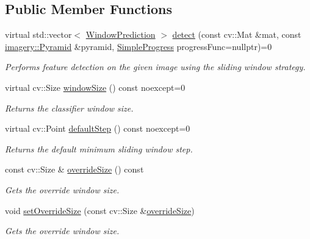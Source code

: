 \subsection*{Public Member Functions}
\begin{DoxyCompactItemize}
\item 
virtual std\+::vector$<$ \hyperlink{structdg_1_1deepcore_1_1classification_1_1_window_prediction}{Window\+Prediction} $>$ \hyperlink{group___classification_module_ga359de047765fb32d9a6f537bf8a4c1f3}{detect} (const cv\+::\+Mat \&mat, const \hyperlink{classdg_1_1deepcore_1_1imagery_1_1_pyramid}{imagery\+::\+Pyramid} \&pyramid, \hyperlink{group___utility_module_ga6763018df79e4bdbcd8cd14cea5342b2}{Simple\+Progress} progress\+Func=nullptr)=0
\begin{DoxyCompactList}\small\item\em Performs feature detection on the given image using the sliding window strategy. \end{DoxyCompactList}\item 
virtual cv\+::\+Size \hyperlink{group___classification_module_ga35c268eb743bfbfb5d77d30ddbcc48e5}{window\+Size} () const noexcept=0
\begin{DoxyCompactList}\small\item\em Returns the classifier window size. \end{DoxyCompactList}\item 
virtual cv\+::\+Point \hyperlink{group___classification_module_ga8e430c585fe3d3bcba00c21f418752d2}{default\+Step} () const noexcept=0
\begin{DoxyCompactList}\small\item\em Returns the default minimum sliding window step. \end{DoxyCompactList}\item 
const cv\+::\+Size \& \hyperlink{classdg_1_1deepcore_1_1classification_1_1_sliding_window_detector_a5c17402f377ea926f2afaf6f1965fa60}{override\+Size} () const 
\begin{DoxyCompactList}\small\item\em Gets the override window size. \end{DoxyCompactList}\item 
void \hyperlink{classdg_1_1deepcore_1_1classification_1_1_sliding_window_detector_a2cc53edf58b59bea7b5c0da7e8de0391}{set\+Override\+Size} (const cv\+::\+Size \&\hyperlink{classdg_1_1deepcore_1_1classification_1_1_sliding_window_detector_a5c17402f377ea926f2afaf6f1965fa60}{override\+Size})
\begin{DoxyCompactList}\small\item\em Gets the override window size. \end{DoxyCompactList}\item 

\end{DoxyCompactItemize}

